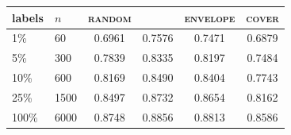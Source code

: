 \begin{tabular}{llcccc}
\toprule
labels & $n$ & \textsc{random} & \ArmBest{} & \textsc{envelope} & \textsc{cover} \\
\midrule
1\% & 60 & 0.6961 & 0.7576 & 0.7471 & 0.6879 \\
5\% & 300 & 0.7839 & 0.8335 & 0.8197 & 0.7484 \\
10\% & 600 & 0.8169 & 0.8490 & 0.8404 & 0.7743 \\
25\% & 1500 & 0.8497 & 0.8732 & 0.8654 & 0.8162 \\
100\% & 6000 & 0.8748 & 0.8856 & 0.8813 & 0.8586 \\
\bottomrule
\end{tabular}
